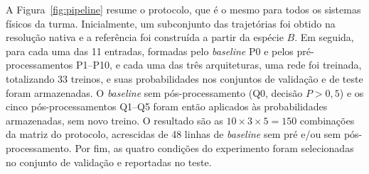 \documentclass[12pt]{article}
\begin{document}
A Figura~\ref{fig:pipeline} resume o protocolo, que é o mesmo para todos os sistemas físicos da turma. Inicialmente, um subconjunto das trajetórias foi obtido na resolução nativa e a referência foi construída a partir da espécie $B$. Em seguida, para cada uma das 11 entradas, formadas pelo \textit{baseline} P0 e pelos pré-processamentos P1--P10, e cada uma das três arquiteturas, uma rede foi treinada, totalizando 33 treinos, e suas probabilidades nos conjuntos de validação e de teste foram armazenadas. O \textit{baseline} sem pós-processamento (Q0, decisão $P>0{,}5$) e os cinco pós-processamentos Q1--Q5 foram então aplicados às probabilidades armazenadas, sem novo treino. O resultado são as $10\times3\times5=150$ combinações da matriz do protocolo, acrescidas de 48 linhas de \textit{baseline} sem pré e/ou sem pós-processamento. Por fim, as quatro condições do experimento foram selecionadas no conjunto de validação e reportadas no teste.
\end{document}
